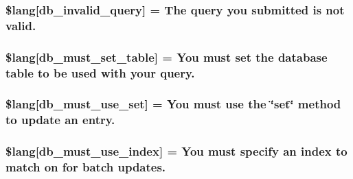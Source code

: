 \subsubsection[{\$lang}]{\setlength{\rightskip}{0pt plus 5cm}\$lang\mbox{[}\textquotesingle{}db\+\_\+invalid\+\_\+query\textquotesingle{}\mbox{]} = \textquotesingle{}The query you submitted is not valid.\textquotesingle{}}\label{db__lang_8php_a2cbf4ee929f45a29a0dcf21280bad485}
\hypertarget{db__lang_8php_a0f5d469f071f2b5327b44761f4a06396}{}
\subsubsection[{\$lang}]{\setlength{\rightskip}{0pt plus 5cm}\$lang\mbox{[}\textquotesingle{}db\+\_\+must\+\_\+set\+\_\+table\textquotesingle{}\mbox{]} = \textquotesingle{}You must set the database table to be used with your query.\textquotesingle{}}\label{db__lang_8php_a0f5d469f071f2b5327b44761f4a06396}
\hypertarget{db__lang_8php_a55e22fb14cedc8ee7f70980bf7f37308}{}
\subsubsection[{\$lang}]{\setlength{\rightskip}{0pt plus 5cm}\$lang\mbox{[}\textquotesingle{}db\+\_\+must\+\_\+use\+\_\+set\textquotesingle{}\mbox{]} = \textquotesingle{}You must use the \char`\"{}set\char`\"{} method to update an entry.\textquotesingle{}}\label{db__lang_8php_a55e22fb14cedc8ee7f70980bf7f37308}
\hypertarget{db__lang_8php_a708419b6b94728c30474ee5fdde3b99b}{}
\subsubsection[{\$lang}]{\setlength{\rightskip}{0pt plus 5cm}\$lang\mbox{[}\textquotesingle{}db\+\_\+must\+\_\+use\+\_\+index\textquotesingle{}\mbox{]} = \textquotesingle{}You must specify an index to match {\bf on} {\bf for} batch updates.\textquotesingle{}}\label{db__lang_8php_a708419b6b94728c30474ee5fdde3b99b}
\hypertarget{db__lang_8php_af946769a3dd5679c60e6f2ef5f7a5aa1}{}

